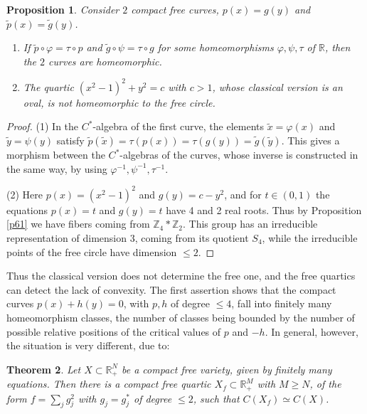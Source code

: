\documentclass[11pt]{amsart}
\newtheorem{theorem}{Theorem}[section]
\newtheorem{proposition}[theorem]{Proposition}
\theoremstyle{definition}
\begin{document}
\begin{proposition}\label{p72}
Consider $2$ compact free curves, $p(x)=g(y)$ and $\tilde p(x)=\tilde g(y)$.
\begin{enumerate}
\item If $\tilde p\circ\varphi=\tau\circ p$ and $\tilde g\circ\psi=\tau\circ g$ for some homeomorphisms $\varphi,\psi,\tau$ of $\mathbb R$, then the $2$ curves are homeomorphic.

\item The quartic $(x^2-1)^2+y^2=c$ with $c>1$, whose classical version is an oval, is not homeomorphic to the free circle.
\end{enumerate}
\end{proposition}

\begin{proof}
(1) In the $C^*$-algebra of the first curve, the elements $\tilde x=\varphi(x)$ and $\tilde y=\psi(y)$ satisfy $\tilde p(\tilde x)=\tau(p(x))=\tau(g(y))=\tilde g(\tilde y)$. This gives a morphism between the $C^*$-algebras of the curves, whose inverse is constructed in the same way, by using $\varphi^{-1},\psi^{-1},\tau^{-1}$.

(2) Here $p(x)=(x^2-1)^2$ and $g(y)=c-y^2$, and for $t\in(0,1)$ the equations $p(x)=t$ and $g(y)=t$ have 4 and 2 real roots. Thus by Proposition \ref{p61} we have fibers coming from $\mathbb Z_4*\mathbb Z_2$. This group has an irreducible representation of dimension 3, coming from its quotient $S_4$, while the irreducible points of the free circle have dimension $\leq2$.
\end{proof}

Thus the classical version does not determine the free one, and the free quartics can detect the lack of convexity. The first assertion shows that the compact curves $p(x)+h(y)=0$, with $p,h$ of degree $\leq4$, fall into finitely many homeomorphism classes, the number of classes being bounded by the number of possible relative positions of the critical values of $p$ and $-h$. In general, however, the situation is very different, due to:

\begin{theorem}\label{t73}
Let $X\subset\mathbb R^N_+$ be a compact free variety, given by finitely many equations. Then there is a compact free quartic $X_f\subset\mathbb R^M_+$ with $M\geq N$, of the form $f=\sum_jg_j^2$ with $g_j=g_j^*$ of degree $\leq2$, such that $C(X_f)\simeq C(X)$.
\end{theorem}
\end{document}
